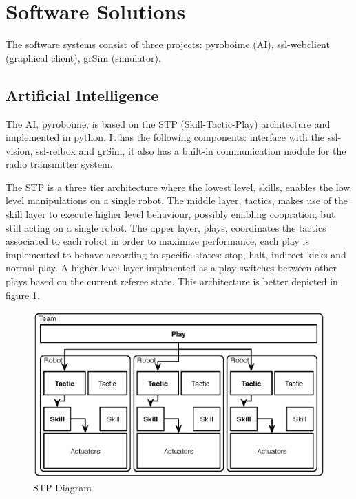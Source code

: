 \section{Software Solutions}\label{soft_sys_sec}

The software systems consist of three projects: pyroboime (AI), ssl-webclient (graphical client), grSim (simulator).

\subsection{Artificial Intelligence}

The AI, pyroboime, is based on the STP (Skill-Tactic-Play) architecture and implemented in python.
It has the following components: interface with the ssl-vision, ssl-refbox and grSim, it also has a built-in communication module for the radio transmitter system.

The STP is a three tier architecture where the lowest level, skills, enables the low level manipulations on a single robot.
The middle layer, tactics, makes use of the skill layer to execute higher level behaviour, possibly enabling coopration, but still acting on a single robot.
The upper layer, plays, coordinates the tactics associated to each robot in order to maximize performance, each play is implemented to behave according to specific states: stop, halt, indirect kicks and normal play.
A higher level layer implmented as a play switches between other plays based on the current referee state.
This architecture is better depicted in figure \ref{STPDiagram}.

\begin{figure}[H]
     \centering
     \includegraphics[width=12cm]{img/stp.eps}
     \caption{STP Diagram}
     \label{STPDiagram}
\end{figure}

